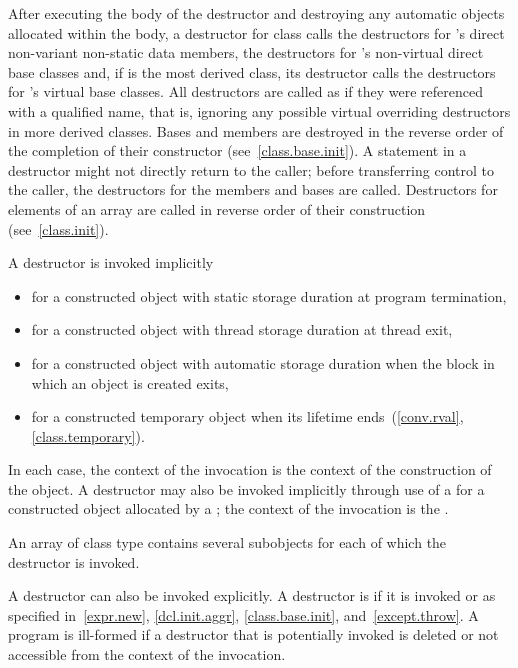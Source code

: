 \pnum
{}%
%
%
After executing the body of the destructor and destroying
any automatic objects allocated within the body, a
destructor for class
calls the destructors for
's
direct non-variant non-static data members, the destructors for
's
non-virtual direct base classes and, if
is the most derived class,
its destructor calls the destructors for
's
virtual base classes.
All destructors are called as if they were referenced with a qualified name,
that is, ignoring any possible virtual overriding destructors in more
derived classes.
Bases and members are destroyed in the reverse order of the completion of
their constructor (see~\ref{class.base.init}).
A
statement in a destructor might not directly return to the
caller; before transferring control to the caller, the destructors for the
members and bases are called.
%
Destructors for elements of an array are called in reverse order of their
construction (see~\ref{class.init}).

\pnum
{}%
%
A destructor is invoked implicitly
\begin{itemize}
\item for a constructed object with static storage duration at program termination,

\item for a constructed object with thread storage duration at thread exit,

\item for a constructed object with automatic storage duration when the block in which an object is created exits,

\item for a constructed temporary object when its lifetime ends~(\ref{conv.rval}, \ref{class.temporary}).
\end{itemize}

%
%
In each case, the context of the invocation is the context of the construction of
the object. A destructor may also be invoked implicitly through use of a
 for a constructed object allocated
by a ; the context of the invocation is the
.
\begin{note}
An array of class type contains several subobjects for each of which
the destructor is invoked.
\end{note}
A destructor can also be invoked explicitly. A destructor is 
if it is invoked or as specified in~\ref{expr.new}, \ref{dcl.init.aggr},
\ref{class.base.init}, and~\ref{except.throw}.
A program is ill-formed if a destructor that is potentially invoked is deleted
or not accessible from the context of the invocation.

